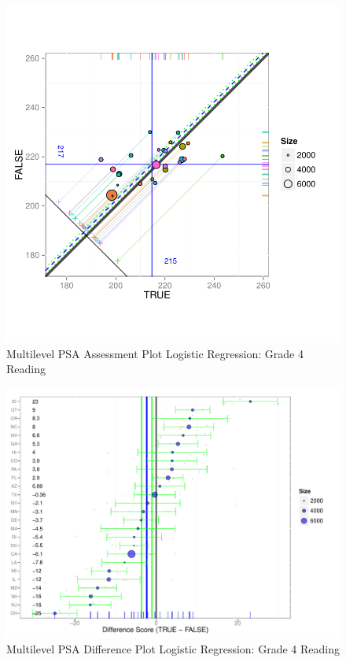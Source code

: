 \documentclass[letterpaper,12p,twoside]{article} %
\begin{document}
\begin{figure}[h!]
\begin{center}
\includegraphics[width=\textwidth]{../Figures2009/g4read-mlpsa-lr-circ.pdf}
\caption{Multilevel PSA Assessment Plot Logistic Regression: Grade 4 Reading}
\end{center}
\end{figure}

\begin{figure}[h!]
\begin{center}
\includegraphics[width=\textwidth]{../Figures2009/g4read-mlpsa-lr-diff.pdf}
\caption{Multilevel PSA Difference Plot Logistic Regression: Grade 4 Reading}
\end{center}
\end{figure}
\end{document}
